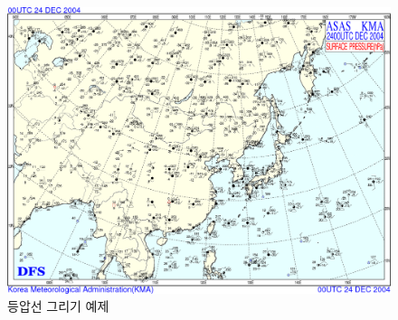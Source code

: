 \begin{figure}[h]\center
	\centering
	\includegraphics[width=1.0\linewidth]{22Weather_forecasting/images/surf_pltstn_pbg_2004122400}
	\caption{등압선 그리기 예제}
	\label{fig:drawweathermap03}
\end{figure}

